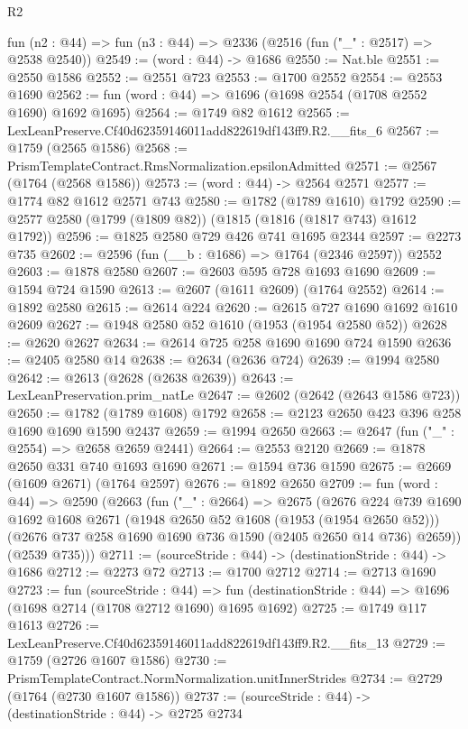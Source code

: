 \begin{lexlean}{R2}
\begin{coremodule}
  fun (n2 : @44) => fun (n3 : @44) => @2336 (@2516 (fun ("_" : @2517) => @2538 @2540))
@2549 := (word : @44) -> @1686
@2550 := Nat.ble
@2551 := @2550 @1586
@2552 := @2551 @723
@2553 := @1700 @2552
@2554 := @2553 @1690
@2562 := fun (word : @44) => @1696 (@1698 @2554 (@1708 @2552 @1690) @1692 @1695)
@2564 := @1749 @82 @1612
@2565 := LexLeanPreserve.Cf40d62359146011add822619df143ff9.R2.__fits_6
@2567 := @1759 (@2565 @1586)
@2568 := PrismTemplateContract.RmsNormalization.epsilonAdmitted
@2571 := @2567 (@1764 (@2568 @1586))
@2573 := (word : @44) -> @2564 @2571
@2577 := @1774 @82 @1612 @2571 @743
@2580 := @1782 (@1789 @1610) @1792
@2590 := @2577 @2580 (@1799 (@1809 @82)) (@1815 (@1816 (@1817 @743) @1612 @1792))
@2596 := @1825 @2580 @729 @426 @741 @1695 @2344
@2597 := @2273 @735
@2602 := @2596 (fun (__b : @1686) => @1764 (@2346 @2597)) @2552
@2603 := @1878 @2580
@2607 := @2603 @595 @728 @1693 @1690
@2609 := @1594 @724 @1590
@2613 := @2607 (@1611 @2609) (@1764 @2552)
@2614 := @1892 @2580
@2615 := @2614 @224
@2620 := @2615 @727 @1690 @1692 @1610 @2609
@2627 := @1948 @2580 @52 @1610 (@1953 (@1954 @2580 @52))
@2628 := @2620 @2627
@2634 := @2614 @725 @258 @1690 @1690 @724 @1590
@2636 := @2405 @2580 @14
@2638 := @2634 (@2636 @724)
@2639 := @1994 @2580
@2642 := @2613 (@2628 (@2638 @2639))
@2643 := LexLeanPreservation.prim_natLe
@2647 := @2602 (@2642 (@2643 @1586 @723))
@2650 := @1782 (@1789 @1608) @1792
@2658 := @2123 @2650 @423 @396 @258 @1690 @1690 @1590 @2437
@2659 := @1994 @2650
@2663 := @2647 (fun ("_" : @2554) => @2658 @2659 @2441)
@2664 := @2553 @2120
@2669 := @1878 @2650 @331 @740 @1693 @1690
@2671 := @1594 @736 @1590
@2675 := @2669 (@1609 @2671) (@1764 @2597)
@2676 := @1892 @2650
@2709 := fun (word : @44) =>
  @2590
    (@2663
      (fun ("_" : @2664) =>
      @2675
        (@2676
          @224
          @739
          @1690
          @1692
          @1608
          @2671
          (@1948 @2650 @52 @1608 (@1953 (@1954 @2650 @52)))
          (@2676 @737 @258 @1690 @1690 @736 @1590 (@2405 @2650 @14 @736) @2659))
        (@2539 @735)))
@2711 := (sourceStride : @44) -> (destinationStride : @44) -> @1686
@2712 := @2273 @72
@2713 := @1700 @2712
@2714 := @2713 @1690
@2723 := fun (sourceStride : @44) =>
  fun (destinationStride : @44) => @1696 (@1698 @2714 (@1708 @2712 @1690) @1695 @1692)
@2725 := @1749 @117 @1613
@2726 := LexLeanPreserve.Cf40d62359146011add822619df143ff9.R2.__fits_13
@2729 := @1759 (@2726 @1607 @1586)
@2730 := PrismTemplateContract.NormNormalization.unitInnerStrides
@2734 := @2729 (@1764 (@2730 @1607 @1586))
@2737 := (sourceStride : @44) -> (destinationStride : @44) -> @2725 @2734

\end{coremodule}
\end{lexlean}
